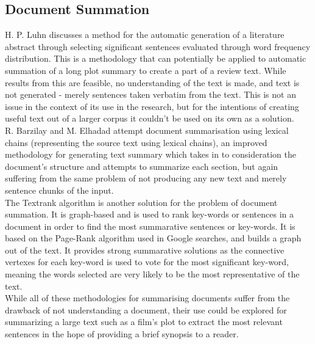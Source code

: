 \subsection{Document Summation}
H. P. Luhn discusses a method for the automatic generation of a literature abstract through selecting significant sentences evaluated through word frequency distribution\cite{AutomatedAbstractGeneration}. This is a methodology that can potentially be applied to automatic summation of a long plot summary to create a part of a review text. While results from this are feasible, no understanding of the text is made, and text is not generated - merely sentences taken verbatim from the text. This is not an issue in the context of its use in the research, but for the intentions of creating useful text out of a larger corpus it couldn't be used on its own as a solution.\\
R. Barzilay and M. Elhadad attempt document summarisation using lexical chains (representing the source text using lexical chains), an improved methodology for generating text summary which takes in to consideration the document's structure and attempts to summarize each section, but again suffering from the same problem of not producing any new text and merely sentence chunks of the input.\cite{LexicalChain}\\

%
The Textrank algorithm is another solution for the problem of document summation. It is graph-based and is used to rank key-words or sentences in a document in order to find the most summarative sentences or key-words\cite{TextRank}. It is based on the Page-Rank algorithm used in Google searches, and builds a graph out of the text. It provides strong summarative solutions as the connective vertexes for each key-word is used to vote for the most significant key-word, meaning the words selected are very likely to be the most representative of the text.\\
While all of these methodologies for summarising documents suffer from the drawback of not understanding a document, their use could be explored for summarizing a large text such as a film's plot to extract the most relevant sentences in the hope of providing a brief synopsis to a reader.
